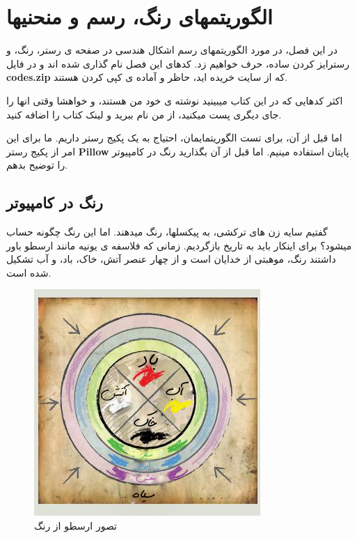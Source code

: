 \documentclass[14pt,a4paper]{memoir}
\begin{document}
	 
	 
	 \chapter{الگوریتمهای رنگ، رسم و منحنیها}\label{draw}
	 
	در این فصل، در مورد الگوریتمهای رسم اشکال هندسی در صفحه ی رستر، رنگ، و رسترایز کردن ساده، حرف خواهیم زد. کدهای این فصل نام گذاری شده اند و در فایل \textbf{codes.zip} که از سایت خریده اید، حاظر و آماده ی کپی کردن هستند.
	
	
\begin{files}
	اکثر کدهایی که در این کتاب میبینید نوشته ی خود من هستند، و خواهشا وقتی انها را جای دیگری پست میکنید، از من نام ببرید و لینک کتاب را اضافه کنید. 
\end{files}


اما قبل از آن، برای تست الگوریتمایمان، احتیاج به یک پکیج رستر داریم. ما برای این امر از پکیج رستر \textbf{Pillow} پایتان استفاده مینیم. اما قبل از آن بگذارید رنگ در کامپیوتر را توضیح بدهم.

\section{رنگ  در کامپیوتر}\label{color}

گفتیم سایه زن های ترکشی، به پیکسلها، رنگ میدهند. اما این رنگ چگونه حساب میشود؟ برای اینکار باید به تاریخ بازگردیم. زمانی که فلاسفه ی یونیه مانند ارسطو باور داشتند رنگ، موهبتی از خدایان است و از چهار عنصر آتش، خاک، باد، و آب تشکیل شده است.

\begin{figure}[H]
	\centering
\includegraphics[scale=1]{GreekColor}
\caption{تصور ارسطو از رنگ}
\end{figure}
\end{document}

